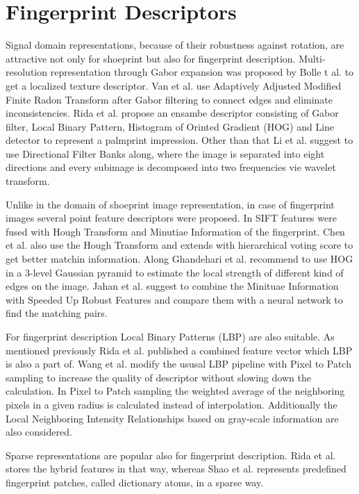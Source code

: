 \documentclass[draft,final]{vutinfth} %
\begin{document}
\section*{Fingerprint Descriptors}
\par
Signal domain representations, because of their robustness against rotation, are attractive not only for shoeprint but also for fingerprint description.
Multi-resolution representation through Gabor expansion was proposed by Bolle t al. \cite{bolle2012fingerprint} to get a localized texture descriptor.
Van et al. \cite{van2016fingerprint} use Adaptively Adjusted Modified Finite Radon Transform after Gabor filtering to connect edges and eliminate inconsistencies.
Rida et al. \cite{rida2018palmprint} propose an ensambe descriptor consisting of Gabor filter, Local Binary Pattern, Histogram of Orinted Gradient (HOG) and Line detector to represent a palmprint impression.
Other than that Li et al. \cite{li2012texture} suggest to use Directional Filter Banks along, where the image is separated into eight directions and every subimage is decomposed into two frequencies vie wavelet transform.
\par
Unlike in the domain of shoeprint image representation, in case of fingerprint images several point feature descriptors were proposed.
In \cite{zhou2011adaptive} SIFT features were fused with Hough Transform and Minutiae Information of the fingerprint.
Chen et al. \cite{chen2013hierarchical} also use the Hough Transform and extends with hierarchical voting score to get better matchin information.
Along  \cite{rida2018palmprint} Ghandehari et al. \cite{ghandehari2012palmprint} recommend to use HOG in a 3-level Gaussian pyramid to estimate the local strength of different kind of edges on the image.
Jahan et al. \cite{jahan2017robust} suggest to combine the Minituae Information with Speeded Up Robust Features and compare them with a neural network to find the matching pairs.
\par
For fingerprint description Local Binary Patterns (LBP) are also suitable.
As mentioned previously Rida et al. \cite{rida2018palmprint} published a combined feature vector which LBP is also a part of.
Wang et al. \cite{wang2013pixel} modify the ususal LBP pipeline with Pixel to Patch sampling to increase the quality of descriptor without slowing down the calculation.
In Pixel to Patch sampling the weighted average of the neighboring pixels in a given radius is calculated instead of interpolation.
Additionally the Local Neighboring Intensity Relationships based on gray-scale information are also considered.
\par
Sparse representations are popular also for fingerprint description.
Rida et al. \cite{rida2018palmprint} stores the hybrid features in that way, whereas Shao et al. \cite{shao2013fingerprint} represents predefined fingerprint patches, called dictionary atoms, in a sparse way.
\end{document}

